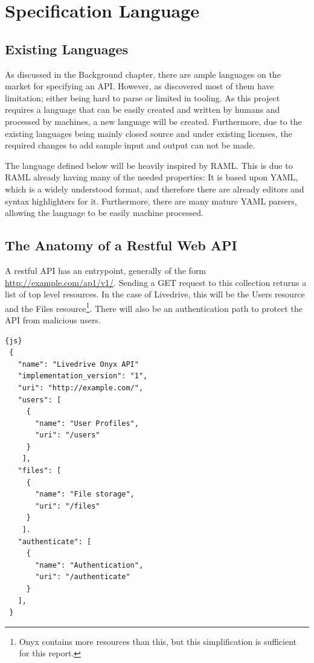 \chapter{Specification Language}

\section{Existing Languages}

As discussed in the Background chapter, there are ample languages on the market for specifying an API. However, as discovered most of them have limitation; either being hard to parse or limited in tooling. As this project requires a language that can be easily created and written by humans and processed by machines, a new language will be created. Furthermore, due to the existing languages being mainly closed source and under existing licenses, the required changes to add sample input and output can not be made.

The language defined below will be heavily inspired by RAML. This is due to RAML already having many of the needed properties: It is based upon YAML, which is a widely understood format, and therefore there are already editors and syntax highlighters for it. Furthermore, there are many mature YAML parsers, allowing the language to be easily machine processed.

\section{The Anatomy of a Restful Web API}
\label{sec:anatomy}
A restful API has an entrypoint, generally of the form \url{http://example.com/ap1/v1/}. Sending a GET request to this collection returns a list of top level resources. In the case of Livedrive, this will be the Users resource and the Files resource\footnote{Onyx contains more resources than this, but this simplification is sufficient for this report.}. There will also be an authentication path to protect the API from malicious users.

\begin{code}
\begin{lstlisting}[frame=lines]{js}
 {
   "name": "Livedrive Onyx API"
   "implementation_version": "1",
   "uri": "http://example.com/",
   "users": [
     {
       "name": "User Profiles",
       "uri": "/users"
     }
    ],
   "files": [
     {
       "name": "File storage",
       "uri": "/files"
     }
    ].
   "authenticate": [
     {
       "name": "Authentication",
       "uri": "/authenticate"
     }
   ],
 }
\end{lstlisting}
\end{code}


